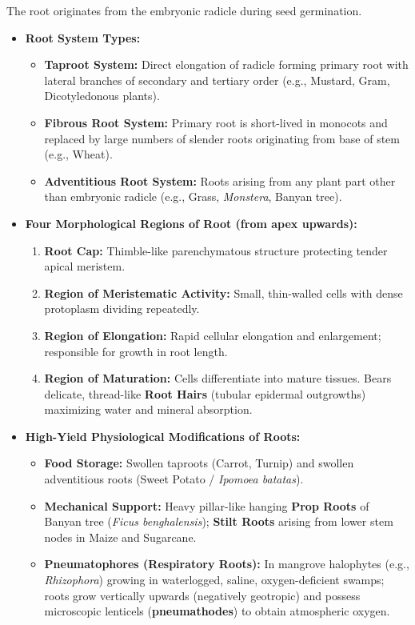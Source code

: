 \documentclass[10pt,twoside,openright]{book}
\begin{document}
\begin{conceptbox}
The root originates from the embryonic radicle during seed germination.
\begin{itemize}[leftmargin=*]
  \item \textbf{Root System Types:}
  \begin{itemize}
    \item \textbf{Taproot System:} Direct elongation of radicle forming primary root with lateral branches of secondary and tertiary order (e.g., Mustard, Gram, Dicotyledonous plants).
    \item \textbf{Fibrous Root System:} Primary root is short-lived in monocots and replaced by large numbers of slender roots originating from base of stem (e.g., Wheat).
    \item \textbf{Adventitious Root System:} Roots arising from any plant part other than embryonic radicle (e.g., Grass, \textit{Monstera}, Banyan tree).
  \end{itemize}
  \item \textbf{Four Morphological Regions of Root (from apex upwards):}
  \begin{enumerate}
    \item \textbf{Root Cap:} Thimble-like parenchymatous structure protecting tender apical meristem.
    \item \textbf{Region of Meristematic Activity:} Small, thin-walled cells with dense protoplasm dividing repeatedly.
    \item \textbf{Region of Elongation:} Rapid cellular elongation and enlargement; responsible for growth in root length.
    \item \textbf{Region of Maturation:} Cells differentiate into mature tissues. Bears delicate, thread-like \textbf{Root Hairs} (tubular epidermal outgrowths) maximizing water and mineral absorption.
  \end{enumerate}
  \item \textbf{High-Yield Physiological Modifications of Roots:}
  \begin{itemize}
    \item \textbf{Food Storage:} Swollen taproots (Carrot, Turnip) and swollen adventitious roots (Sweet Potato / \textit{Ipomoea batatas}).
    \item \textbf{Mechanical Support:} Heavy pillar-like hanging \textbf{Prop Roots} of Banyan tree (\textit{Ficus benghalensis}); \textbf{Stilt Roots} arising from lower stem nodes in Maize and Sugarcane.
    \item \textbf{Pneumatophores (Respiratory Roots):} In mangrove halophytes (e.g., \textit{Rhizophora}) growing in waterlogged, saline, oxygen-deficient swamps; roots grow vertically upwards (negatively geotropic) and possess microscopic lenticels (\textbf{pneumathodes}) to obtain atmospheric oxygen.
  \end{itemize}
\end{itemize}
\end{conceptbox}
\end{document}
